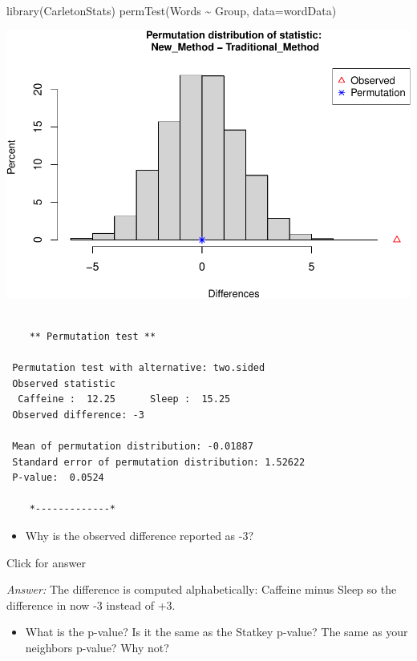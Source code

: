 \documentclass[
]{book}
\newenvironment{Shaded}{\begin{snugshade}}{\end{snugshade}}
\newcommand{\AttributeTok}[1]{\textcolor[rgb]{0.77,0.63,0.00}{#1}}
\newcommand{\FunctionTok}[1]{\textcolor[rgb]{0.00,0.00,0.00}{#1}}
\newcommand{\NormalTok}[1]{#1}
\newcommand{\SpecialCharTok}[1]{\textcolor[rgb]{0.00,0.00,0.00}{#1}}
\providecommand{\tightlist}{%
  \setlength{\itemsep}{0pt}\setlength{\parskip}{0pt}}
\begin{document}
\begin{Shaded}
\begin{Highlighting}[]
\FunctionTok{library}\NormalTok{(CarletonStats)}
\FunctionTok{permTest}\NormalTok{(Words }\SpecialCharTok{\textasciitilde{}}\NormalTok{ Group, }\AttributeTok{data=}\NormalTok{wordData)}
\end{Highlighting}
\end{Shaded}

\includegraphics[width=1\linewidth]{Class_Activity_13_files/figure-latex/unnamed-chunk-2-1}

\begin{verbatim}

    ** Permutation test **

 Permutation test with alternative: two.sided 
 Observed statistic
  Caffeine :  12.25      Sleep :  15.25 
 Observed difference: -3 

 Mean of permutation distribution: -0.01887 
 Standard error of permutation distribution: 1.52622 
 P-value:  0.0524 

    *-------------*
\end{verbatim}

\begin{itemize}
\tightlist
\item
  Why is the observed difference reported as -3?
\end{itemize}

Click for answer

\emph{Answer:} The difference is computed alphabetically: Caffeine minus Sleep so the difference in now -3 instead of +3.

\begin{itemize}
\tightlist
\item
  What is the p-value? Is it the same as the Statkey p-value? The same as your neighbors p-value? Why not?
\end{itemize}
\end{document}
